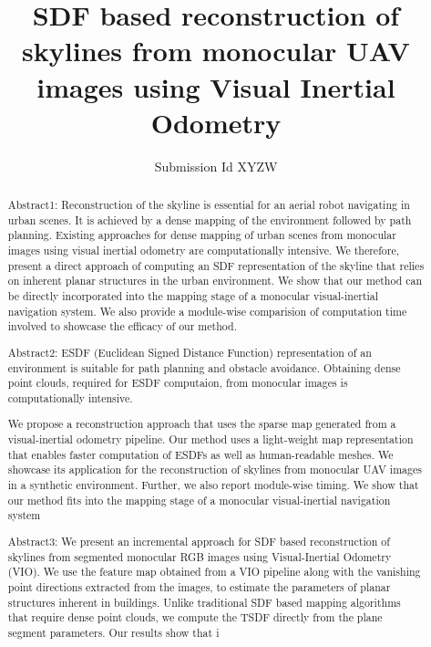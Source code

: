 \documentclass[sigconf, review=true]{acmart}
\begin{document}
\title{SDF based reconstruction of skylines from monocular UAV images using Visual Inertial Odometry}

\author{Submission Id XYZW}


\renewcommand{\shortauthors}{}


\begin{abstract}
Abstract1:
Reconstruction of the skyline is essential for an aerial robot navigating in urban scenes. It is achieved by a dense mapping of the environment followed by path planning.
Existing approaches for dense mapping of urban scenes from monocular images using visual inertial odometry are computationally intensive. 
We therefore, present a direct approach of computing an SDF representation of the skyline that relies on inherent planar structures in the urban environment. We show that our method can be directly incorporated into the mapping stage of a monocular visual-inertial navigation system. We also provide a module-wise comparision of computation time involved to showcase the efficacy of our method.

Abstract2:
ESDF (Euclidean Signed Distance Function) representation of an environment is suitable for path planning and obstacle avoidance. Obtaining dense point clouds, required for ESDF computaion, from monocular images is computationally intensive.

We propose a reconstruction approach that uses the sparse map generated from a visual-inertial odometry pipeline. Our method uses a light-weight map representation that enables  faster computation of ESDFs as well as human-readable meshes. We showcase its application for the reconstruction of skylines from monocular UAV images in a synthetic environment. Further, we also report module-wise timing. We show that our method fits into the mapping stage of a monocular visual-inertial navigation system

Abstract3:
We present an incremental approach for SDF based reconstruction of skylines from segmented monocular RGB images using Visual-Inertial Odometry (VIO). We use the feature map obtained from a VIO pipeline along with the vanishing point directions extracted from the images, to estimate the parameters of planar structures inherent in buildings. Unlike 
traditional SDF based mapping algorithms that require dense point clouds, we compute the TSDF directly from the plane segment parameters. Our results show that i 


\end{abstract}
\end{document}
